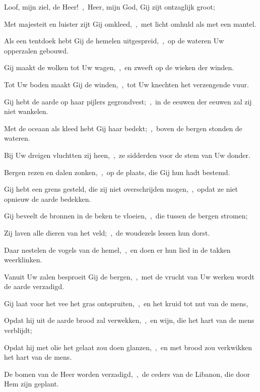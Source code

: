 \documentclass[12pt,twoside,a5paper]{article}
\begin{document}

\begin{halfparskip}
   Loof, mijn ziel, de Heer!~\sep\ Heer, mijn God, Gij zijt ontzaglijk groot;


  Met majesteit en luister zijt Gij omkleed,~\sep\ met licht omhuld als met een mantel.

  Als een tentdoek hebt Gij de hemelen uitgespreid,~\sep\ op de wateren Uw opperzalen gebouwd.

  Gij maakt de wolken tot Uw wagen,~\sep\ en zweeft op de wieken der winden.

  Tot Uw boden maakt Gij de winden,~\sep\ tot Uw knechten het verzengende vuur.

  Gij hebt de aarde op haar pijlers gegrondvest;~\sep\ in de eeuwen der eeuwen zal zij niet wankelen.

  Met de oceaan als kleed hebt Gij haar bedekt;~\sep\ boven de bergen stonden de wateren.

  Bij Uw dreigen vluchtten zij heen,~\sep\ ze sidderden voor de stem van Uw donder.

  Bergen rezen en dalen zonken,~\sep\ op de plaats, die Gij hun hadt bestemd.

  Gij hebt een grens gesteld, die zij niet overschrijden mogen,~\sep\ opdat ze niet opnieuw de aarde bedekken.

  Gij beveelt de bronnen in de beken te vloeien,~\sep\ die tussen de bergen stromen;

  Zij laven alle dieren van het veld;~\sep\ de woudezels lessen hun dorst.

  Daar nestelen de vogels van de hemel,~\sep\ en doen er hun lied in de takken weerklinken.

  Vanuit Uw zalen besproeit Gij de bergen,~\sep\ met de vrucht van Uw werken wordt de aarde verzadigd.

  Gij laat voor het vee het gras ontspruiten,~\sep\ en het kruid tot nut van de mens,

  Opdat hij uit de aarde brood zal verwekken,~\sep\ en wijn, die het hart van de mens verblijdt;

  Opdat hij met olie het gelaat zou doen glanzen,~\sep\ en met brood zou verkwikken het hart van de mens.

  De bomen van de Heer worden verzadigd,~\sep\ de ceders van de Libanon, die door Hem zijn geplant.


\end{halfparskip}
\end{document}
